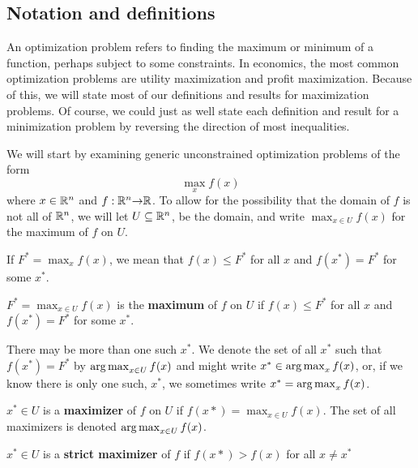 \subsection{Notation and definitions}
An optimization problem refers to finding the maximum or minimum of a
function, perhaps subject to some constraints. In economics, the most
common optimization problems are utility maximization and profit
maximization. Because of this, we will state most of our definitions
and results for maximization problems. Of course, we could just as
well state each definition and result for a minimization problem by
reversing the direction of most inequalities.

We will start by examining generic unconstrained optimization problems
of the form
\[ \max_{x} f(x) \] 
where $x \in \mathbb{R}^n$ and $f:\mathbb{R}^n {\rightarrow} \mathbb{R}$. To allow for the possibility
that the domain of $f$ is not all of $\mathbb{R}^n$, we will let $U \subseteq
\mathbb{R}^n$, be the domain, and write $\max_{x \in U} f(x)$ for the maximum
of $f$ on $U$. 

If $F^* = \max_{x} f(x)$, we mean that $f(x) \leq F^*$ for all $x$ and
$f(x^*) = F^*$ for some $x^*$.
\begin{definition}\label{d:max}
  $F^* = \max_{x \in U} f(x)$ is the \textbf{maximum} of $f$ on $U$ if
  $f(x) \leq F^*$ for all $x$ and $f(x^*) = F^*$ for some $x^*$.
\end{definition}
There may be more than one such $x^*$. We denote the set of all $x^*$
such that $f(x^*) = F^*$ by $\argmax_{x \in U} f(x)$ and might write
$x^* \in \argmax_{x} f(x)$, or, if we know there is only one
such, $x^*$, we sometimes write $x^* = \argmax_{x} f(x)$.
\begin{definition} \label{d:maxer}
  $x^* \in U$ is a \textbf{maximizer} of $f$ on $U$ if $f(x*)
  = \max_{x \in U} 
  f(x)$. The set of all maximizers is denoted $\argmax_{x \in U}
  f(x)$.
\end{definition}
\begin{definition}\label{d:smaxer}
  $x^* \in U$ is a \textbf{strict maximizer} of $f$ if $f(x*) > f(x)
  $ for all $x \neq x^*$
\end{definition}

